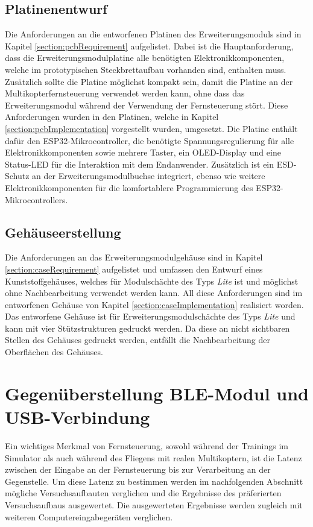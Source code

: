 \subsection{Platinenentwurf}
Die Anforderungen an die entworfenen Platinen des Erweiterungsmoduls sind in Kapitel \ref{section:pcbRequirement} aufgelistet. Dabei ist die Hauptanforderung, dass die Erweiterungsmodulplatine alle benötigten Elektronikkomponenten, welche im prototypischen Steckbrettaufbau vorhanden sind, enthalten muss. Zusätzlich sollte die Platine möglichst kompakt sein, damit die Platine an der Multikopterfernsteuerung verwendet werden kann, ohne dass das Erweiterungsmodul während der Verwendung der Fernsteuerung stört. Diese Anforderungen wurden in den Platinen, welche in Kapitel \ref{section:pcbImplementation} vorgestellt wurden, umgesetzt. Die Platine enthält dafür den ESP32-Mikrocontroller, die benötigte Spannungsregulierung für alle Elektronikkomponenten sowie mehrere Taster, ein \acs{OLED}-Display und eine Status-\acs{LED} für die Interaktion mit dem Endanwender. Zusätzlich ist ein \ac{ESD}-Schutz an der Erweiterungsmodulbuchse integriert, ebenso wie weitere Elektronikkomponenten für die komfortablere Programmierung des ESP32-Mikrocontrollers.

\subsection{Gehäuseerstellung}
Die Anforderungen an das Erweiterungsmodulgehäuse sind in Kapitel \ref{section:caseRequirement} aufgelistet und umfassen den Entwurf eines Kunststoffgehäuses, welches für Modulschächte des Typs \textit{Lite} ist und möglichst ohne Nachbearbeitung verwendet werden kann. All diese Anforderungen sind im entworfenen Gehäuse von Kapitel \ref{section:caseImplementation} realisiert worden. Das entworfene Gehäuse ist für Erweiterungsmodulschächte des Typs \textit{Lite} und kann mit vier Stützstrukturen gedruckt werden. Da diese an nicht sichtbaren Stellen des Gehäuses gedruckt werden, entfällt die Nachbearbeitung der Oberflächen des Gehäuses.

\section{Gegenüberstellung \acs{BLE}-Modul und USB-Verbindung}
Ein wichtiges Merkmal von Fernsteuerung, sowohl während der Trainings im Simulator als auch während des Fliegens mit realen Multikoptern, ist die Latenz zwischen der Eingabe an der Fernsteuerung bis zur Verarbeitung an der Gegenstelle. Um diese Latenz zu bestimmen werden im nachfolgenden Abschnitt mögliche Versuchsaufbauten verglichen und  die Ergebnisse des präferierten Versuchsaufbaus ausgewertet. Die ausgewerteten Ergebnisse werden zugleich mit weiteren Computereingabegeräten verglichen.

